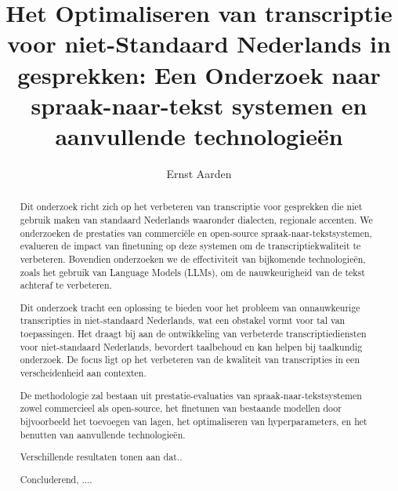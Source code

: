 \documentclass{hogent-article}
\title{Het Optimaliseren van transcriptie voor niet-Standaard Nederlands in gesprekken: Een Onderzoek naar spraak-naar-tekst systemen en aanvullende technologieën}
\author{Ernst Aarden}
\begin{document}
\begin{abstract}
   Dit onderzoek richt zich op het verbeteren van transcriptie voor gesprekken die niet gebruik maken van standaard Nederlands waaronder dialecten, regionale accenten. We onderzoeken de prestaties van commerciële en open-source spraak-naar-tekstsystemen, evalueren de impact van finetuning op deze systemen om de transcriptiekwaliteit te verbeteren. Bovendien onderzoeken we de effectiviteit van bijkomende technologieën, zoals het gebruik van Language Models (LLMs), om de nauwkeurigheid van de tekst achteraf te verbeteren.
   \vspace{5mm}
   \par Dit onderzoek tracht een oplossing te bieden voor het probleem van onnauwkeurige transcripties in niet-standaard Nederlands, wat een obstakel vormt voor tal van toepassingen. Het draagt bij aan de ontwikkeling van verbeterde transcriptiediensten voor niet-standaard Nederlands, bevordert taalbehoud en kan helpen bij taalkundig onderzoek. De focus ligt op het verbeteren van de kwaliteit van transcripties in een verscheidenheid aan contexten.
   \vspace{5mm}
   \par De methodologie zal bestaan uit prestatie-evaluaties van spraak-naar-tekstsystemen zowel commercieel als open-source,  het finetunen van bestaande modellen door bijvoorbeeld het toevoegen van lagen, het optimaliseren van hyperparameters, en het benutten van aanvullende technologieën.
   \vspace{5mm}
   \par Verschillende resultaten tonen aan dat..
   \vspace{5mm}
   \par Concluderend, ....
   
\end{abstract}

\tableofcontents



\printbibliography[heading=bibintoc]
\end{document}
